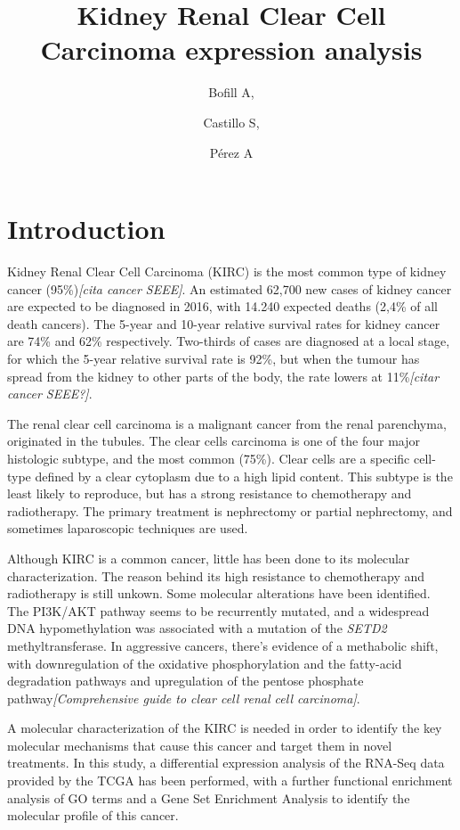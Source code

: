\documentclass[9pt,twocolumn,twoside]{gsajnl}
\title{Kidney Renal Clear Cell Carcinoma expression analysis}
\author[$\ast$1]{Bofill A,}
\author[$\ast$1]{Castillo S,}
\author[$\ast$1]{Pérez A}
\affil[$\ast$]{Msc in Bioinformatics for Health Sciences, Pompeu Fabra University}
\begin{document}
\maketitle
\thispagestyle{firststyle}
\marginmark
\firstpagefootnote
{}
\vspace{-11pt}%


\section*{Introduction}

Kidney Renal Clear Cell Carcinoma (KIRC) is the most common type of kidney cancer (95\%)\emph{[cita cancer SEEE]}.  An estimated 62,700 new cases of kidney cancer are expected to be diagnosed in 2016, with 14.240 expected deaths (2,4\% of all death cancers).   The  5-year  and  10-year  relative  survival  rates  for  kidney  
cancer are 74\% and 62\% respectively.  Two-thirds of cases 
 are diagnosed at a local stage, for which the 5-year relative 
survival  rate  is  92\%, but when the tumour has spread from the kidney to other parts of the body, the rate lowers at 11\%\emph{[citar cancer SEEE?]}. 

The renal clear cell carcinoma is a malignant cancer from the renal parenchyma, originated in the tubules. The clear cells carcinoma is one of the four major histologic subtype, and the most common (75\%). Clear cells are a specific cell-type defined by a clear cytoplasm due to a high lipid content. This subtype is the least likely to reproduce, but has a strong resistance to chemotherapy and radiotherapy. The primary treatment is nephrectomy or partial nephrectomy, and sometimes laparoscopic techniques are used. 
	

Although KIRC is a common cancer, little has been done to its molecular characterization. The reason behind its high resistance to chemotherapy and radiotherapy is still unkown. Some molecular alterations have been identified. The PI3K/AKT pathway seems to be recurrently mutated, and a widespread DNA hypomethylation was associated with a mutation of the \textit{SETD2} methyltransferase. In aggressive cancers, there's evidence of a methabolic shift, with downregulation of the oxidative phosphorylation  and the fatty-acid degradation pathways and upregulation of the pentose phosphate pathway\emph{[Comprehensive guide to clear cell renal cell carcinoma]}.

A molecular characterization of the KIRC is needed in order to identify the key molecular mechanisms that cause this cancer and target them in novel treatments. In this study,  a differential expression analysis of the RNA-Seq data provided by the TCGA has been performed, with a further functional enrichment analysis of GO terms and a Gene Set Enrichment Analysis to identify the molecular profile of this cancer.
\end{document}
